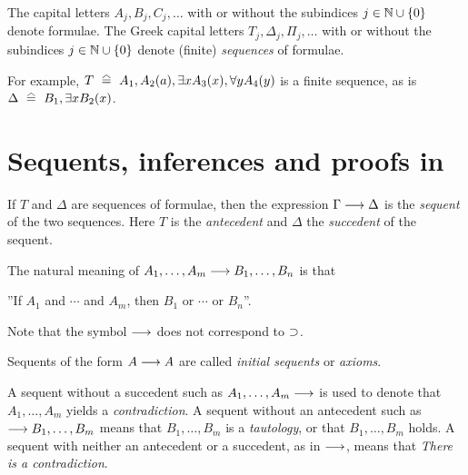 \documentclass[11pt,a4paper]{article}
\begin{document}
\begin{definition}
    The capital letters \(A_j, B_j, C_j, \ldots\) with or without the subindices \(j \in \mathbb{N}\cup\{0\}\) denote formulae.
    The Greek capital letters \(T_j, \Delta_j, \Pi_j,\ldots\) with or without the subindices \(j\in\mathbb{N}\cup\{0\}\)
    denote (finite) \emph{sequences} of formulae.
    \label{def:alphabet of formulae}
\end{definition}

For example, \(T\corr A_1, A_2(a), \exists x A_3(x), \forall y A_4(y)\) is a finite sequence,
as is \(\Delta \corr B_1, \exists x B_2(x)\).


\section{Sequents, inferences and proofs in \LK}

\begin{definition}%
    \label{def:sequent}
    If \(T\) and \(\Delta\) are sequences of formulae,
    then the expression \(\Gamma\longrightarrow\Delta\) is the \emph{sequent} of the two sequences.
    Here \(T\) is the \emph{antecedent} and \(\Delta\) the \emph{succedent}
    of the sequent.
\end{definition}

The natural meaning of \(A_1, \ldots,A_m\longrightarrow B_1,\ldots,B_n\) is that
\begin{center}
''If \(A_1\) and \(\cdots\) and \(A_m\), then \(B_1\) or \(\cdots\) or \(B_n\)''.
\end{center}
Note that the symbol \(\longrightarrow\) does not correspond to \(\supset\).

\begin{definition}[Axioms]%
    \label{def:axiom}
    Sequents of the form \(A\longrightarrow A\) are called \emph{initial sequents} or \emph{axioms}.
\end{definition}

\begin{definition}%
    \label{def:contradiction and tautology}
    A sequent without a succedent such as \(A_1, \ldots,A_m\longrightarrow\)
    is used to denote that \(A_1, \ldots,A_m\) yields a \emph{contradiction}.
    A sequent without an antecedent such as \(\longrightarrow B_1,\ldots,B_m\) means that
    \(B_1,\ldots,B_m\) is a \emph{tautology}, or that \(B_1,\ldots,B_m\) holds.
    A sequent with neither an antecedent or a succedent, as in \(\longrightarrow\),
    means that \emph{There is a contradiction}.
\end{definition}
\end{document}
